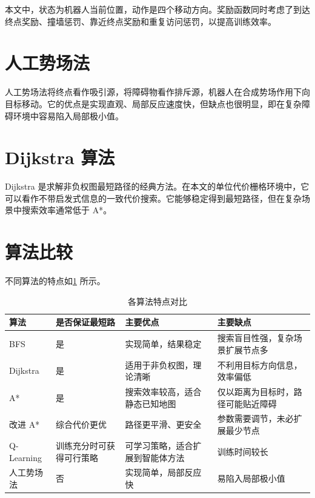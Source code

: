 本文中，状态为机器人当前位置，动作是四个移动方向。奖励函数同时考虑了到达终点奖励、撞墙惩罚、靠近终点奖励和重复访问惩罚，以提高训练效率。

\section{人工势场法}

人工势场法将终点看作吸引源，将障碍物看作排斥源，机器人在合成势场作用下向目标移动。它的优点是实现直观、局部反应速度快，但缺点也很明显，即在复杂障碍环境中容易陷入局部极小值。

\section{Dijkstra 算法}

Dijkstra 是求解非负权图最短路径的经典方法。在本文的单位代价栅格环境中，它可以看作不带启发式信息的一致代价搜索。它能够稳定得到最短路径，但在复杂场景中搜索效率通常低于 A*。

\section{算法比较}

不同算法的特点如\cref{tab:method-comparison} 所示。

\begin{table}[!htb]
  \centering
  \caption{各算法特点对比}\label{tab:method-comparison}
  \begin{tabular}{@{}p{2.3cm}p{2.6cm}p{3.3cm}p{4.6cm}@{}}
    \toprule
    \textbf{算法} & \textbf{是否保证最短路} & \textbf{主要优点} & \textbf{主要缺点} \\
    \midrule
    BFS & 是 & 实现简单，结果稳定 & 搜索盲目性强，复杂场景扩展节点多 \\
    Dijkstra & 是 & 适用于非负权图，理论清晰 & 不利用目标方向信息，效率偏低 \\
    A* & 是 & 搜索效率较高，适合静态已知地图 & 仅以距离为目标时，路径可能贴近障碍 \\
    改进 A* & 综合代价更优 & 路径更平滑、更安全 & 参数需要调节，未必扩展最少节点 \\
    Q-Learning & 训练充分时可获得可行策略 & 可学习策略，适合扩展到智能体方法 & 训练时间较长 \\
    人工势场法 & 否 & 实现简单，局部反应快 & 易陷入局部极小值 \\
    \bottomrule
  \end{tabular}
\end{table}
